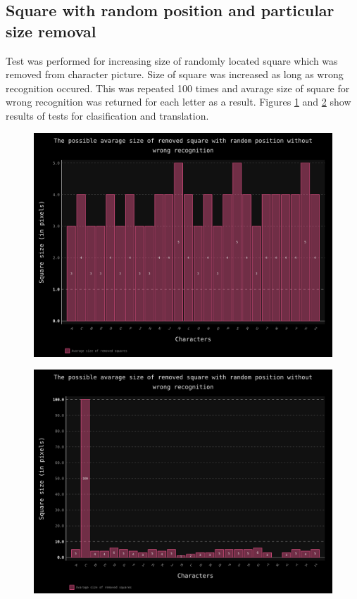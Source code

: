 \documentclass[a4paper]{article}
\begin{document}
\clearpage
\subsection{Square with random position and particular size removal}
Test was performed for increasing size of randomly located square which was removed from character picture. Size of square was increased as long as wrong recognition occured. This was repeated 100 times and avarage size of square for wrong recognition was returned for each letter as a result. Figures \ref{squares_trans} and \ref{squares_clas} show results of tests for clasification and translation. 
\begin{figure}[ht]
	\centering
	\includegraphics[scale=0.7,keepaspectratio=true]{Charts/SquaresTestPlanResultsChart_NormalTester.png}	
	\caption{}
	\label{squares_trans}
\end{figure}

\begin{figure}[t]
	\centering
	\includegraphics[scale=0.7,keepaspectratio=true]{Charts/SquaresTestPlanResultsChart_ClasifierTester.png}	
	\caption{}
	\label{squares_clas}
\end{figure}
\end{document}
